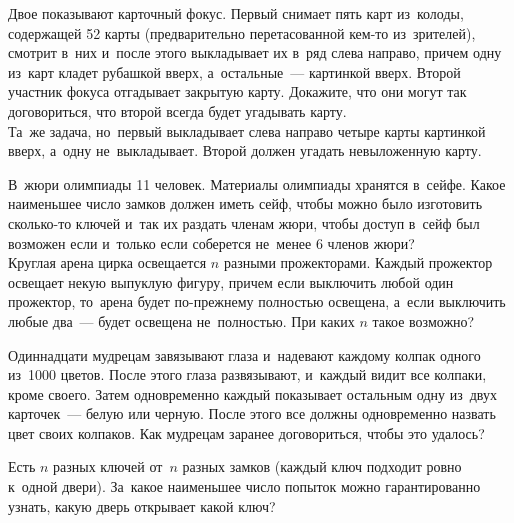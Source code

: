 \begin{problems}
\item
\subproblem
Двое показывают карточный фокус.
Первый снимает пять карт из~колоды, содержащей 52 карты
(предварительно перетасованной кем-то из~зрителей),
смотрит в~них и~после этого выкладывает их в~ряд слева направо, причем одну
из~карт кладет рубашкой вверх, а~остальные~--- картинкой вверх.
Второй участник фокуса отгадывает закрытую карту.
Докажите, что они могут так договориться, что второй всегда будет угадывать
карту.
\\
\subproblem
Та~же задача, но~первый выкладывает слева направо четыре карты картинкой вверх,
а~одну не~выкладывает.
Второй должен угадать невыложенную карту.

\item
\subproblem
В~жюри олимпиады 11 человек.
Материалы олимпиады хранятся в~сейфе.
Какое наименьшее число замков должен иметь сейф, чтобы можно было изготовить
сколько-то ключей и~так их раздать членам жюри, чтобы доступ в~сейф был
возможен если и~только если соберется не~менее 6 членов жюри?
\\
\subproblem
Круглая арена цирка освещается $n$ разными прожекторами.
Каждый прожектор освещает некую выпуклую фигуру, причем если выключить любой
один прожектор, то~арена будет по-прежнему полностью освещена, а~если выключить
любые два~--- будет освещена не~полностью.
При каких $n$ такое возможно?

\itemx{*}
Одиннадцати мудрецам завязывают глаза и~надевают каждому колпак одного из~1000
цветов.
После этого глаза развязывают, и~каждый видит все колпаки, кроме своего.
Затем одновременно каждый показывает остальным одну из~двух карточек~--- белую
или черную.
После этого все должны одновременно назвать цвет своих колпаков.
Как мудрецам заранее договориться, чтобы это удалось?

\itemx{*}
Есть $n$ разных ключей от~$n$ разных замков
(каждый ключ подходит ровно к~одной двери).
За~какое наименьшее число попыток можно гарантированно узнать, какую дверь
открывает какой ключ?

\end{problems}


